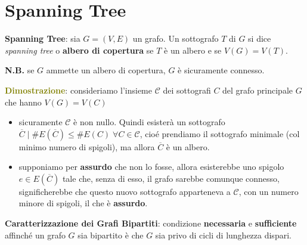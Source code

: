 \section{Spanning Tree}
\begin{flushleft}
    \textbf{Spanning Tree}: sia $G = (V, E)$ un grafo. Un sottografo $T$ di $G$ si dice \textit{spanning tree} o \textbf{albero di copertura} se $T$ è un albero e se $V(G) = V(T)$.

    \textbf{N.B.} se $G$ ammette un albero di copertura, $G$ è sicuramente connesso.
    \begin{boxA}
        \textcolor{olive}{\textbf{Dimostrazione}}: consideriamo l'insieme $\mathcal{C}$ dei sottografi $C$ del grafo principale $G$ che hanno $V(G) = V(C)$
        \begin{itemize}[nosep]
            \item sicuramente $\mathcal{C}$ è non nullo. Quindi esisterà un sottografo $\overline{C} \; | \; \# E(\overline{C}) \leq \# E(C) \; \forall C \in \mathcal{C}$, cioé prendiamo il sottografo minimale (col minimo numero di spigoli), ma allora $\overline{C}$ è un albero.
            \item supponiamo per \textbf{assurdo} che non lo fosse, allora esisterebbe uno spigolo $e \in E(\overline{C})$ tale che, senza di esso, il grafo sarebbe comunque connesso, significherebbe che questo nuovo sottografo apparteneva a $\mathcal{C}$, con un numero minore di spigoli, il che è \textbf{assurdo}.
        \end{itemize}
    \end{boxA}

    \textbf{Caratterizzazione dei Grafi Bipartiti}: condizione \textbf{necessaria} e \textbf{sufficiente} affinché un grafo $G$ sia bipartito è che $G$ sia privo di cicli di lunghezza dispari.


\end{flushleft}
